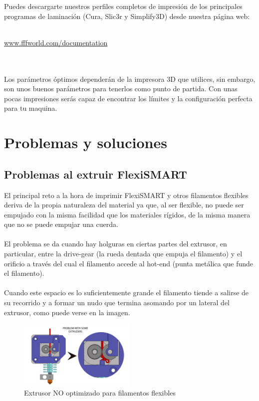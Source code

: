 \documentclass[11pt,a4paper]{article}
\begin{document}
Puedes descargarte nuestros perfiles completos de impresión de los principales programas de laminación (Cura, Slic3r y Simplify3D) desde nuestra página web:
\\\\
\centerline{ {\huge \url{www.fffworld.com/documentation} } }
\\\\
Los parámetros óptimos dependerán de la impresora 3D que utilices, sin embargo, son unos buenos parámetros para tenerlos como punto de partida. Con unas pocas impresiones serás capaz de encontrar los límites y la configuración perfecta para tu maquina.
\section{Problemas y soluciones}
	\subsection{Problemas al extruir FlexiSMART}
El principal reto a la hora de imprimir FlexiSMART y otros filamentos flexibles deriva de la propia naturaleza del material ya que, al ser flexible, no puede ser empujado con la misma facilidad que los materiales rígidos, de la misma manera que no se puede empujar una cuerda.
\\\\
El problema se da cuando hay holguras en ciertas partes del extrusor, en particular, entre la drive-gear (la rueda dentada que empuja el filamento) y el orificio a través del cual el filamento accede al hot-end (punta metálica que funde el filamento).
\\\\
Cuando este espacio es lo suficientemente grande el filamento tiende a salirse de su recorrido y a formar un nudo que termina asomando por un lateral del extrusor, como puede verse en la imagen.
\begin{figure}[H]
\centering
\includegraphics[width=0.5\textwidth,cfbox=azul_marcos 4pt 0pt]{FOTOS/NUDOS1}
\caption*{Extrusor NO optimizado para filamentos flexibles}
\end{figure}
\end{document}
